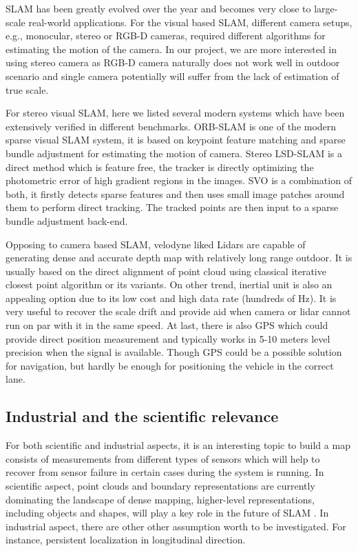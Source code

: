 \gls{SLAM} has been greatly evolved over the year and becomes very
close to large-scale real-world applications. For the visual based
\gls{SLAM}, different camera setups, e.g., monocular, stereo or RGB-D
cameras, required different algorithms for estimating the motion of
the camera. In our project, we are more interested in using stereo
camera as RGB-D camera naturally does not work well in outdoor scenario
and single camera potentially will suffer from the lack of estimation
of true scale.


For stereo visual \gls{SLAM}, here we listed several modern systems
which have been extensively verified in different
benchmarks. ORB-SLAM\cite{DBLP:journals/corr/Mur-ArtalT16a} is one of the modern sparse visual \gls{SLAM}
system, it is based on keypoint feature matching and sparse bundle
adjustment for estimating the motion of camera. Stereo LSD-SLAM\cite{7353631} is
a direct method which is feature free, the tracker is directly
optimizing the photometric error of  high gradient regions in the
images. SVO\cite{7782863} is a combination of both, it firstly detects sparse
features and then uses small image patches around them to perform
direct tracking. The tracked points are then input to a sparse bundle
adjustment back-end.

Opposing to camera based \gls{SLAM}, velodyne liked Lidars are capable
of generating dense and accurate depth map with relatively long range
outdoor. It is usually based on the direct alignment of point cloud
using classical iterative closest point algorithm or its variants. On
other trend, inertial unit is also an appealing option due to its low
cost and high data rate (hundreds of Hz). It is very useful to recover
the scale drift and provide aid when camera or lidar cannot run on par
with it in the same speed. At last, there is also GPS which could
provide direct position measurement and typically works in 5-10 meters
level precision when the signal is available. Though GPS could be a
possible solution for navigation, but hardly be enough for positioning
the vehicle in the correct lane.


\subsection{Industrial and the scientific relevance}

For both scientific and industrial aspects, it is an interesting topic
to build a map consists of measurements from different types of
sensors which will help to recover from sensor failure in certain
cases during the system is running. In scientific aspect, point clouds
and boundary representations are currently dominating the landscape of
dense mapping, higher-level representations, including objects and
shapes, will play a key role in the future of \gls{SLAM} \cite{DBLP:journals/corr/CadenaCCLSN0L16}. In
industrial aspect, there are other other assumption worth to be
investigated. For instance, persistent localization in longitudinal
direction.


